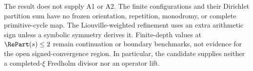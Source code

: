 The result does not supply A1 or A2.  The finite configurations and their
Dirichlet partition sum have no frozen orientation, repetition, monodromy, or
complete primitive-cycle map.  The Liouville-weighted refinement uses an
extra arithmetic sign unless a symbolic symmetry derives it.  Finite-depth
values at \(\RePart(s)\le2\) remain continuation or boundary benchmarks, not
evidence for the open signed-convergence region.  In particular, the
candidate supplies neither a completed-\(\xi\) Fredholm divisor nor an
operator lift.

